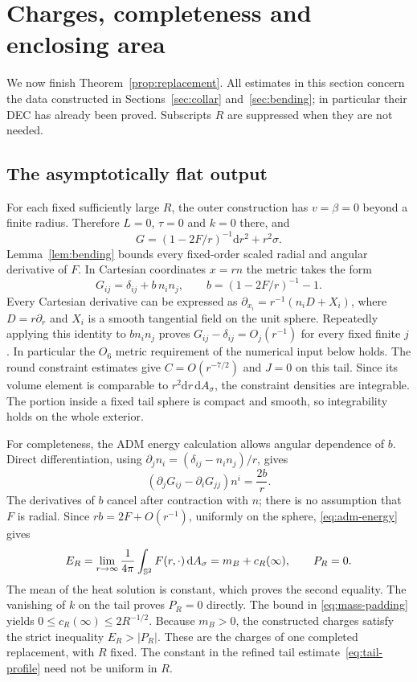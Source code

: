 \section{Charges, completeness and enclosing area}\label{sec:transfer}

We now finish Theorem~\ref{prop:replacement}. All estimates in this
section concern the data constructed in Sections~\ref{sec:collar}
and~\ref{sec:bending}; in particular their DEC has already been proved.
Subscripts $R$ are suppressed when they are not needed.

\subsection{The asymptotically flat output}
For each fixed sufficiently large $R$, the outer construction has
$v=\beta=0$ beyond a finite radius. Therefore $L=0$, $\tau=0$ and
$k=0$ there, and
\begin{equation}\label{eq:af-tail}
 G=(1-2F/r)^{-1}\mathrm dr^2+r^2\sigma.
\end{equation}
Lemma~\ref{lem:bending} bounds every fixed-order scaled radial and
angular derivative of $F$. In Cartesian coordinates $x=rn$ the metric
takes the form
\[
 G_{ij}=\delta_{ij}+b\,n_i n_j,
 \qquad b=(1-2F/r)^{-1}-1.
\]
Every Cartesian derivative can be expressed as
$\partial_{x_i}=r^{-1}(n_iD+X_i)$, where $D=r\partial_r$ and
$X_i$ is a smooth tangential field on the unit sphere. Repeatedly applying
this identity to $b n_i n_j$ proves
$G_{ij}-\delta_{ij}=O_j(r^{-1})$ for every fixed finite $j$.
In particular the $O_6$ metric requirement of the numerical input below
holds. The round constraint estimates
give $C=O(r^{-7/2})$ and $J=0$ on this tail. Since its volume element
is comparable to $r^2\mathrm dr\,\mathrm dA_\sigma$, the constraint
densities are integrable. The portion inside a fixed tail sphere is
compact and smooth, so integrability holds on the whole exterior.

For completeness, the ADM energy calculation allows angular dependence
of $b$. Direct differentiation, using $\partial_jn_i=(\delta_{ij}
-n_i n_j)/r$, gives
\[
 (\partial_jG_{ij}-\partial_iG_{jj})n^i=\frac{2b}{r}.
\]
The derivatives of $b$ cancel after contraction with $n$; there is no
assumption that $F$ is radial. Since $rb=2F+O(r^{-1})$, uniformly on
the sphere, \eqref{eq:adm-energy} gives
\begin{equation}\label{eq:replacement-charges}
 E_R=\lim_{r\to\infty}\frac{1}{4\pi}\int_{\mathbb S^2}F(r,\cdot)\,\mathrm dA_\sigma
 =m_B+c_R(\infty),\qquad P_R=0.
\end{equation}
The mean of the heat solution is constant, which proves the second
equality. The vanishing of $k$ on the tail proves $P_R=0$ directly.
The bound in \eqref{eq:mass-padding} yields
$0\leq c_R(\infty)\leq2R^{-1/2}$. Because $m_B>0$, the constructed
charges satisfy the strict inequality $E_R>|P_R|$.
These are the charges of one completed replacement, with $R$ fixed.
The constant in the refined tail estimate~\eqref{eq:tail-profile}
need not be uniform in $R$.

